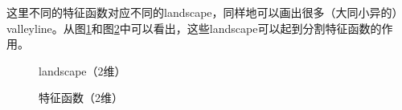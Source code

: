\documentclass[12pt,a4paper]{article}
\begin{document}
这里不同的特征函数对应不同的landscape，同样地可以画出很多（大同小异的）valleyline。从图\ref{fb2}和图\ref{fb3}中可以看出，这些landscape可以起到分割特征函数的作用。
\begin{figure}[h]
\centering
{}
\caption{landscape（2维）}
\label{fb2}
\end{figure}
\begin{figure}[h]
\centering
{}
\caption{特征函数（2维）}
\label{fb3}
\end{figure}
\end{document}
